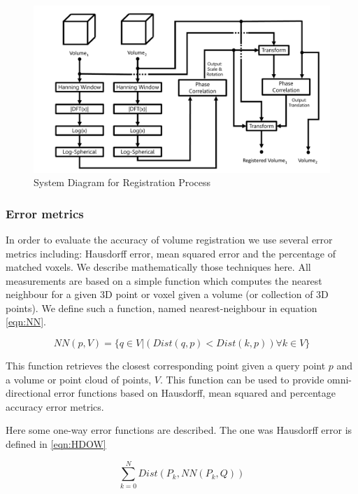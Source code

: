 \begin{figure}[t]
\centering
\includegraphics[width=6.0in]{images/ch2/pipeline2}
\caption{System Diagram for Registration Process}
\label{fig:PIPELINE}
\end{figure}


\subsubsection{Error metrics}

\label{metricsSection}

In order to evaluate the accuracy of volume registration we use several error metrics including: Hausdorff error, mean squared error and the percentage of matched voxels. We describe mathematically those techniques here. All measurements are based on a simple function which computes the nearest neighbour for a given 3D point or voxel given a volume (or collection of 3D points). We define such a function, named nearest-neighbour in equation \ref{eqn:NN}.

\begin{equation} \label{eqn:NN}
NN(p, V) =  \{ q \in V | (Dist(q, p) < Dist(k, p))  \forall k \in V \}
\end{equation}

This function retrieves the closest corresponding point given a query point $p$ and a volume or point cloud of points, $V$. This function can be used to provide omni-directional error functions based on Hausdorff, mean squared and percentage accuracy error metrics.

Here some one-way error functions are described. The one was Hausdorff error is defined in \ref{eqn:HDOW} 

\begin{equation} \label{eqn:HDOW}
\sum_{k=0}^{N} Dist(P_k, NN(P_k, Q))
\end{equation}


